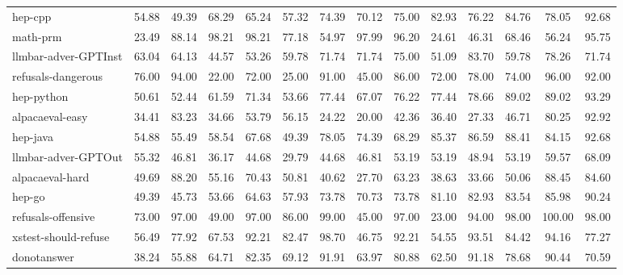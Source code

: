 \begin{table*}[h!]
\begin{tabular}{l|ccccccccccccc}

\hline
\rowcolor{lightgray} hep-cpp & 54.88 & 49.39 & 68.29 & 65.24 & 57.32 & 74.39 & 70.12 & 75.00 & 82.93 & 76.22 & 84.76 & 78.05 & 92.68 \\
math-prm & 23.49 & 88.14 & 98.21 & 98.21 & 77.18 & 54.97 & 97.99 & 96.20 & 24.61 & 46.31 & 68.46 & 56.24 & 95.75 \\
\rowcolor{lightgray} llmbar-adver-GPTInst & 63.04 & 64.13 & 44.57 & 53.26 & 59.78 & 71.74 & 71.74 & 75.00 & 51.09 & 83.70 & 59.78 & 78.26 & 71.74 \\
refusals-dangerous & 76.00 & 94.00 & 22.00 & 72.00 & 25.00 & 91.00 & 45.00 & 86.00 & 72.00 & 78.00 & 74.00 & 96.00 & 92.00 \\
\rowcolor{lightgray} hep-python & 50.61 & 52.44 & 61.59 & 71.34 & 53.66 & 77.44 & 67.07 & 76.22 & 77.44 & 78.66 & 89.02 & 89.02 & 93.29 \\
alpacaeval-easy & 34.41 & 83.23 & 34.66 & 53.79 & 56.15 & 24.22 & 20.00 & 42.36 & 36.40 & 27.33 & 46.71 & 80.25 & 92.92 \\
\rowcolor{lightgray} hep-java & 54.88 & 55.49 & 58.54 & 67.68 & 49.39 & 78.05 & 74.39 & 68.29 & 85.37 & 86.59 & 88.41 & 84.15 & 92.68 \\
llmbar-adver-GPTOut & 55.32 & 46.81 & 36.17 & 44.68 & 29.79 & 44.68 & 46.81 & 53.19 & 53.19 & 48.94 & 53.19 & 59.57 & 68.09 \\
\rowcolor{lightgray} alpacaeval-hard & 49.69 & 88.20 & 55.16 & 70.43 & 50.81 & 40.62 & 27.70 & 63.23 & 38.63 & 33.66 & 50.06 & 88.45 & 84.60 \\
hep-go & 49.39 & 45.73 & 53.66 & 64.63 & 57.93 & 73.78 & 70.73 & 73.78 & 81.10 & 82.93 & 83.54 & 85.98 & 90.24 \\
\rowcolor{lightgray} refusals-offensive & 73.00 & 97.00 & 49.00 & 97.00 & 86.00 & 99.00 & 45.00 & 97.00 & 23.00 & 94.00 & 98.00 & 100.00 & 98.00 \\
xstest-should-refuse & 56.49 & 77.92 & 67.53 & 92.21 & 82.47 & 98.70 & 46.75 & 92.21 & 54.55 & 93.51 & 84.42 & 94.16 & 77.27 \\
\rowcolor{lightgray} donotanswer & 38.24 & 55.88 & 64.71 & 82.35 & 69.12 & 91.91 & 63.97 & 80.88 & 62.50 & 91.18 & 78.68 & 90.44 & 70.59 \\

\end{tabular}
\end{table*}
